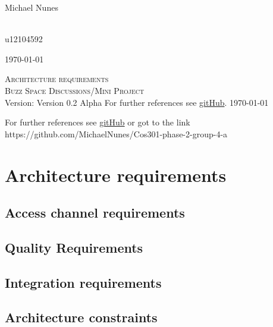 \documentclass[a4paper,12pt]{report}
\begin{document}
\begin{titlepage}
\begin{center}
\begin{minipage}{0.4\textwidth}
\end{minipage}
\begin{minipage}{0.4\textwidth}
\begin{flushleft} \large
Michael {Nunes}
\end{flushleft}
\end{minipage}
\begin{minipage}{0.4\textwidth}
\begin{flushright} \large
\emph{} \\
u12104592
\end{flushright}
\end{minipage}
\vfill
{\large \today}
\end{center}
\end{titlepage}
\footnotesize
%
\normalsize

\renewcommand{\thesection}{\arabic{section}}
\newpage
\begin{center}
\textsc{\LARGE Architecture requirements}\\[1.5cm]
\textsc{\Large Buzz Space Discussions/Mini Project}\\[0.5cm]
Version: Version 0.2 Alpha 
For further references see \href{ https://github.com/MichaelNunes/Cos301-phase-2-group-4-a}{gitHub}.
\today
\end{center}
\tableofcontents{}
For further references see \href{https://github.com/MichaelNunes/Cos301-phase-2-group-4-a}{gitHub} or got to the link https://github.com/MichaelNunes/Cos301-phase-2-group-4-a

\section{Architecture requirements}
\subsection{Access channel requirements}
	
\subsection{Quality Requirements}
	
\subsection{Integration requirements}
	
\subsection{Architecture constraints}
	
\end{document}
